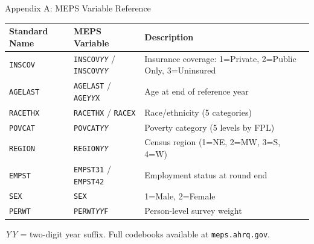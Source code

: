 \documentclass[10pt,english,aspectratio=169]{beamer}
\begin{document}
\begin{frame}{Appendix A: MEPS Variable Reference}

\begin{small}
\begin{tabular}{llp{6cm}}
\toprule
\textbf{Standard Name} & \textbf{MEPS Variable} & \textbf{Description} \\
\midrule
\texttt{INSCOV} & \texttt{INSCOV\textit{YY}} / \texttt{INSCOVY\textit{Y}} & Insurance coverage: 1=Private, 2=Public Only, 3=Uninsured \\
\texttt{AGELAST} & \texttt{AGELAST} / \texttt{AGE\textit{YY}X} & Age at end of reference year \\
\texttt{RACETHX} & \texttt{RACETHX} / \texttt{RACEX} & Race/ethnicity (5 categories) \\
\texttt{POVCAT} & \texttt{POVCAT\textit{YY}} & Poverty category (5 levels by FPL) \\
\texttt{REGION} & \texttt{REGION\textit{YY}} & Census region (1=NE, 2=MW, 3=S, 4=W) \\
\texttt{EMPST} & \texttt{EMPST31} / \texttt{EMPST42} & Employment status at round end \\
\texttt{SEX} & \texttt{SEX} & 1=Male, 2=Female \\
\texttt{PERWT} & \texttt{PERWT\textit{YY}F} & Person-level survey weight \\
\bottomrule
\end{tabular}
\end{small}

\vspace{0.3cm}
\textit{YY} = two-digit year suffix. Full codebooks available at \texttt{meps.ahrq.gov}.

\end{frame}
\end{document}
